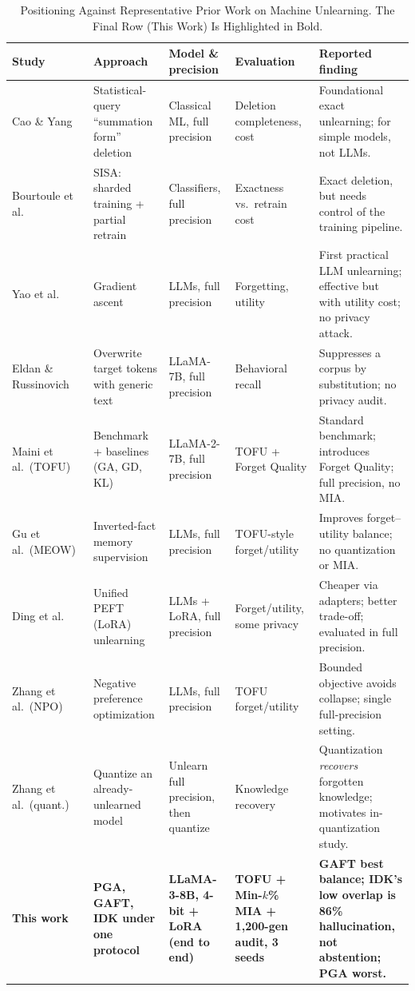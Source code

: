 \documentclass[journal]{IEEEtran}
\begin{document}
\begin{table}[!t]
\renewcommand{\arraystretch}{1.3}
\caption{Positioning Against Representative Prior Work on Machine Unlearning. The Final Row (This Work) Is Highlighted in Bold.}
\label{tab:priorwork}
\centering
\footnotesize
\begin{tabular}{p{2.3cm} p{3.2cm} p{2.6cm} p{3.0cm} p{4.0cm}}
\hline
\textbf{Study} & \textbf{Approach} & \textbf{Model \& precision} & \textbf{Evaluation} & \textbf{Reported finding} \\
\hline
Cao \& Yang~\cite{cao2015unlearning} & Statistical-query ``summation form'' deletion & Classical ML, full precision & Deletion completeness, cost & Foundational exact unlearning; for simple models, not LLMs. \\
Bourtoule et al.~\cite{bourtoule2021machine} & SISA: sharded training + partial retrain & Classifiers, full precision & Exactness vs.\ retrain cost & Exact deletion, but needs control of the training pipeline. \\
Yao et al.~\cite{yao2023unlearning} & Gradient ascent & LLMs, full precision & Forgetting, utility & First practical LLM unlearning; effective but with utility cost; no privacy attack. \\
Eldan \& Russinovich~\cite{eldan2023harrypotter} & Overwrite target tokens with generic text & LLaMA-7B, full precision & Behavioral recall & Suppresses a corpus by substitution; no privacy audit. \\
Maini et al.\ (TOFU)~\cite{maini2024tofu} & Benchmark + baselines (GA, GD, KL) & LLaMA-2-7B, full precision & TOFU + Forget Quality & Standard benchmark; introduces Forget Quality; full precision, no MIA. \\
Gu et al.\ (MEOW)~\cite{gu2024meow} & Inverted-fact memory supervision & LLMs, full precision & TOFU-style forget/utility & Improves forget--utility balance; no quantization or MIA. \\
Ding et al.~\cite{ding2024peft} & Unified PEFT (LoRA) unlearning & LLMs + LoRA, full precision & Forget/utility, some privacy & Cheaper via adapters; better trade-off; evaluated in full precision. \\
Zhang et al.\ (NPO)~\cite{zhang2024npo} & Negative preference optimization & LLMs, full precision & TOFU forget/utility & Bounded objective avoids collapse; single full-precision setting. \\
Zhang et al.\ (quant.)~\cite{zhang2024quantization} & Quantize an already-unlearned model & Unlearn full precision, then quantize & Knowledge recovery & Quantization \emph{recovers} forgotten knowledge; motivates in-quantization study. \\
\hline
\textbf{This work} & \textbf{PGA, GAFT, IDK under one protocol} & \textbf{LLaMA-3-8B, 4-bit + LoRA (end to end)} & \textbf{TOFU + Min-$k$\% MIA + 1{,}200-gen audit, 3 seeds} & \textbf{GAFT best balance; IDK's low overlap is 86\% hallucination, not abstention; PGA worst.} \\
\hline
\end{tabular}
\end{table}
\end{document}
